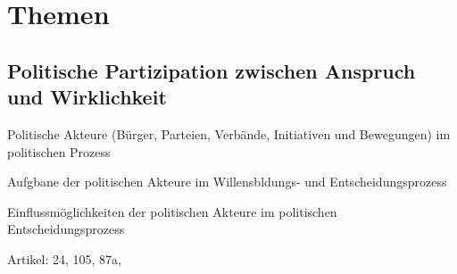 \chapter{Themen}

\section{Politische Partizipation zwischen Anspruch und Wirklichkeit}

Politische Akteure (Bürger, Parteien, Verbände, Initiativen und Bewegungen) im politischen Prozess
\startitemize[packed]
\item Aufgbane der politischen Akteure im Willensbldungs- und Entscheidungsprozess
\item Einflussmöglichkeiten der politischen Akteure im politischen Entscheidungsprozess
\stopitemize


\startitemize[packed]
\item Artikel:  24, 105, 87a, 
\stopitemize
